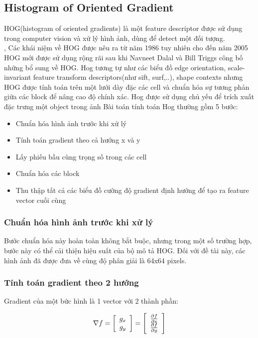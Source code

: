 \documentclass[10pt,conference,a4paper]{IEEEtran}
\begin{document}
\subsection{Histogram of Oriented Gradient}   
HOG(histogram of oriented gradients) là một feature descriptor được sử dụng trong computer vision và xử lý hình ảnh, dùng để detect một đối tượng.\cite{viblo.asia} \cite{learnopencv} \\,
Các khái niệm về HOG được nêu ra từ năm 1986 tuy nhiên cho đến năm 2005 HOG mới được sử dụng rộng rãi sau khi Navneet Dalal và Bill Triggs công bố những bổ sung về HOG. Hog tương tự như các biểu đồ edge orientation, scale-invariant feature transform descriptors(như sift, surf,..), shape contexts nhưng HOG được tính toán trên một lưới dày đặc các cell và chuẩn hóa sự tương phản giữa các block để nâng cao độ chính xác. Hog được sử dụng chủ yếu để trích xuất đặc trưng một object trong ảnh Bài toán tính toán Hog thường gồm 5 bước:
	\begin{itemize}
		\item Chuẩn hóa hình ảnh trước khi xử lý
		\item Tính toán gradient theo cả hướng x và y
		\item Lấy phiếu bầu cùng trọng số trong các cell
		\item Chuẩn hóa các block
		\item Thu thập tất cả các biểu đồ cường độ gradient định hướng để tạo ra feature vector cuối cùng
	\end{itemize}

\subsubsection{Chuẩn hóa hình ảnh trước khi xử lý}
%
Bước chuẩn hóa này hoàn toàn không bắt buộc, nhưng trong một số trường hợp, bước này có thể cải thiện hiệu suất của bộ mô tả HOG. Đối với đề tài này, các hình ảnh đã được đưa về cùng độ phân giải là 64x64 pixels.
\subsubsection{Tính toán gradient theo 2 hướng }
Gradient của một bức hình là 1 vector với 2 thành phần:

\[\nabla f = \left[ {\begin{array}{*{20}{c}}
	{{g_x}}\\
	{{g_y}}
	\end{array}} \right] = \left[ {\begin{array}{*{20}{c}}
	{\frac{{\partial f}}{{\partial {\rm{x}}}}}\\
	{\frac{{\partial f}}{{\partial y}}}
	\end{array}} \right]\]
\end{document}
